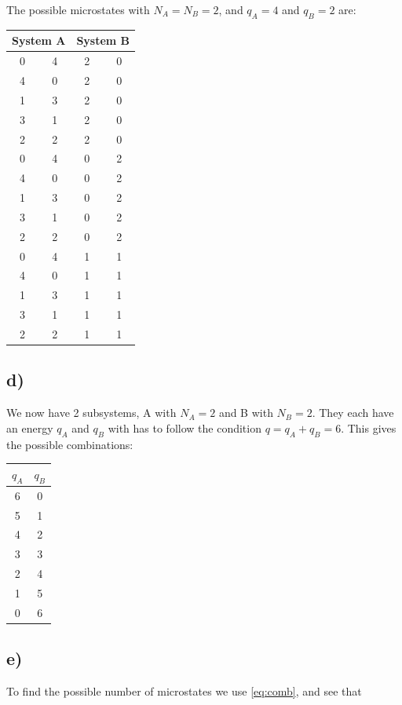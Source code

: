\documentclass[a4paper,norsk, 10pt]{article}
\begin{document}
The possible microstates with $N_A = N_B = 2$, and $q_A = 4$ and $q_B = 2$ are:

\begin{table}[H]
\centering
\begin{tabular}{|c|c||c|c|}
\hline
\multicolumn{2}{|c||}{System A} & \multicolumn{2}{c|}{System B}\\
\hline
0 & 4 & 2& 0\\
4 & 0 & 2& 0\\
1 & 3 & 2& 0\\
3 & 1 & 2& 0\\
2 & 2 & 2& 0\\
\hline
0 & 4 & 0& 2\\
4 & 0 & 0& 2\\
1 & 3 & 0& 2\\
3 & 1 & 0& 2\\
2 & 2 & 0& 2\\
\hline
0 & 4 & 1& 1\\
4 & 0 & 1& 1\\
1 & 3 & 1& 1\\
3 & 1 & 1& 1\\
2 & 2 & 1& 1\\
\hline
\end{tabular}
\end{table}\label{tab:c}

\subsection{d)}

We now have 2 subsystems, A with $N_A = 2$ and B with $N_B = 2$. They each have an energy $q_A$ and $q_B$ with has to follow the condition $q = q_A + q_B = 6$. This gives the possible combinations:

\begin{table}[H]
\centering
\begin{tabular}{|c|c|}
\hline
$q_A$ & $q_B$ \\
\hline
6 & 0 \\
5 & 1\\
4 & 2\\
3 & 3\\
2 & 4\\
1 & 5\\
0 & 6\\
\hline
\end{tabular}
\end{table} 

\subsection{e)}
To find the possible number of microstates we use \eqref{eq:comb}, and see that
\end{document}
